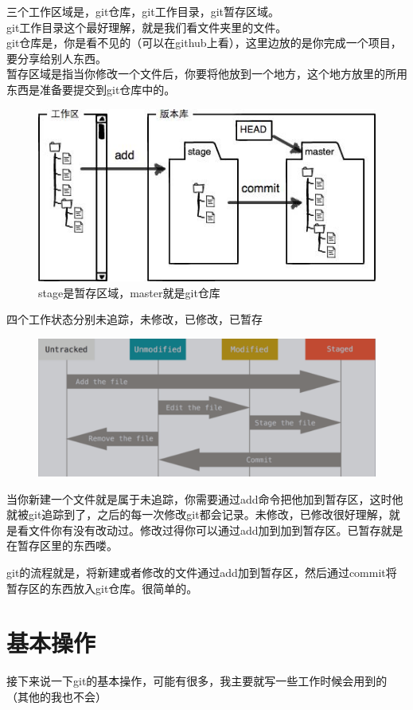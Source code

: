 \documentclass[12pt,a4paper]{article}
\begin{document}
        三个工作区域是，git仓库，git工作目录，git暂存区域。\\git工作目录这个最好理解，就是我们看文件夹里的文件。\\git仓库是，你是看不见的（可以在github上看），这里边放的是你完成一个项目，要分享给别人东西。\\暂存区域是指当你修改一个文件后，你要将他放到一个地方，这个地方放里的所用东西是准备要提交到git仓库中的。
\begin{figure}[H]
	\centering
	\includegraphics[width=0.7\linewidth]{figures/1.jpg}
	\caption{stage是暂存区域，master就是git仓库}
	\label{fig:1}
\end{figure}

        四个工作状态分别未追踪，未修改，已修改，已暂存            
\begin{figure}[H]
	\centering
	\includegraphics[width=0.7\linewidth]{figures/3.png}
	\caption{}
	\label{fig:3}
\end{figure}
       当你新建一个文件就是属于未追踪，你需要通过add命令把他加到暂存区，这时他就被git追踪到了，之后的每一次修改git都会记录。未修改，已修改很好理解，就是看文件你有没有改动过。修改过得你可以通过add加到加到暂存区。已暂存就是在暂存区里的东西喽。
       
       git的流程就是，将新建或者修改的文件通过add加到暂存区，然后通过commit将暂存区的东西放入git仓库。很简单的。

		\section{基本操作}
	    接下来说一下git的基本操作，可能有很多，我主要就写一些工作时候会用到的（其他的我也不会）
	    
\end{document}
